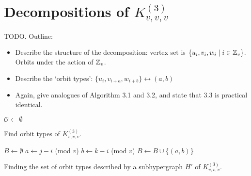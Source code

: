 \section{Decompositions of $K_{v,v,v}^{(3)}$}
\label{sec:methods/gdd}

TODO. Outline:

\begin{itemize}
    \item Describe the structure of the decomposition: vertex set is $\{u_i, v_i, w_i \mid i \in \mathbb{Z}_v\}$. Orbits under the action of $\mathbb{Z}_v$.
    \item Describe the `orbit types': $\{u_i, v_{i+a}, w_{i+b}\} \leftrightarrow (a, b)$
    \item Again, give analogues of Algorithm 3.1 and 3.2, and state that 3.3 is practical identical.
\end{itemize}

\begin{algorithm}

$\mathcal{O} \gets \emptyset$\;


\;

\caption{Find orbit types of $K_{v,v,v}^{(3)}$.} \label{alg:get-gdd-types}
\end{algorithm}

\begin{algorithm}
$B \gets \emptyset$\;
 {
    $a \gets j-i$ (mod $v$)\;
    $b \gets k-i$ (mod $v$)\;
    $B \gets B \cup \{(a, b)\}$\;
}
\;
\caption{Finding the set of orbit types described by a subhypergraph $H'$ of $K_{v,v,v}^{(3)}$.} \label{alg:gdd-hypergraph-type}
\end{algorithm}